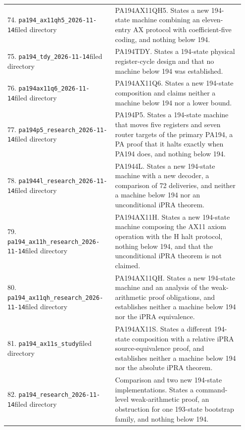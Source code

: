 \begin{longtable}{@{}p{0.43\linewidth}p{0.52\linewidth}@{}}
74. \nolinkurl{pa194_ax11qh5_2026-11-14}\newline filed directory&PA194AX11QH5. States a new 194-state machine combining an eleven-entry AX protocol with coefficient-five coding, and nothing below 194.\\[5pt]
75. \nolinkurl{pa194_tdy_2026-11-14}\newline filed directory&PA194TDY. States a 194-state physical register-cycle design and that no machine below 194 was established.\\[5pt]
76. \nolinkurl{pa194ax11q6_2026-11-14}\newline filed directory&PA194AX11Q6. States a new 194-state composition and claims neither a machine below 194 nor a lower bound.\\[5pt]
77. \nolinkurl{pa194p5_research_2026-11-14}\newline filed directory&PA194P5. States a 194-state machine that moves five registers and seven router targets of the primary PA194, a PA proof that it halts exactly when PA194 does, and nothing below 194.\\[5pt]
78. \nolinkurl{pa1944l_research_2026-11-14}\newline filed directory&PA1944L. States a new 194-state machine with a new decoder, a comparison of 72 deliveries, and neither a machine below 194 nor an unconditional iPRA theorem.\\[5pt]
79. \nolinkurl{pa194_ax11h_research_2026-11-14}\newline filed directory&PA194AX11H. States a new 194-state machine composing the AX11 axiom operation with the H halt protocol, nothing below 194, and that the unconditional iPRA theorem is not claimed.\\[5pt]
80. \nolinkurl{pa194_ax11qh_research_2026-11-14}\newline filed directory&PA194AX11QH. States a new 194-state machine and an analysis of the weak-arithmetic proof obligations, and establishes neither a machine below 194 nor the iPRA equivalence.\\[5pt]
81. \nolinkurl{pa194_ax11s_study}\newline filed directory&PA194AX11S. States a different 194-state composition with a relative iPRA source-equivalence proof, and establishes neither a machine below 194 nor the absolute iPRA theorem.\\[5pt]
82. \nolinkurl{pa194_research_2026-11-14}\newline filed directory&Comparison and two new 194-state implementations. States a command-level weak-arithmetic proof, an obstruction for one 193-state bootstrap family, and nothing below 194.\\[5pt]

\end{longtable}

